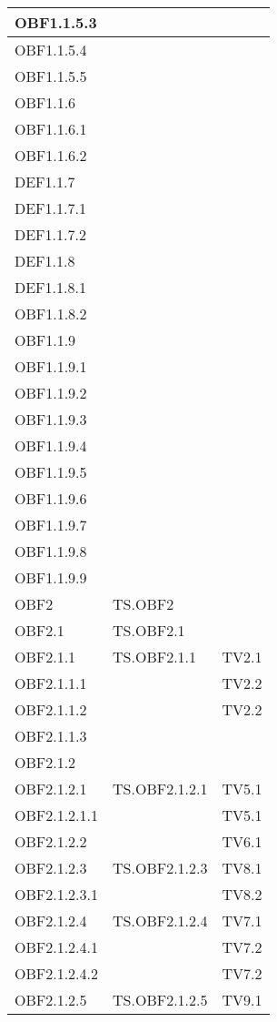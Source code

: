 \documentclass{scalatekids-article}
\begin{document}
\begin{longtable}[H]{|l|p{4cm}|p{4cm}|}
\hline
OBF1.1.5.3 &  &\\
\hline
OBF1.1.5.4 &  &\\
\hline
OBF1.1.5.5 &  &\\
\hline
OBF1.1.6 & &\\
\hline
OBF1.1.6.1 &  &\\
\hline
OBF1.1.6.2 &  &\\
\hline
DEF1.1.7 & &\\
\hline
DEF1.1.7.1 & &\\
\hline
DEF1.1.7.2 & &\\
\hline
DEF1.1.8 & &\\
\hline
DEF1.1.8.1 & &\\
\hline
OBF1.1.8.2 &  &\\
\hline
OBF1.1.9 &  &\\
\hline
OBF1.1.9.1 &  &\\
\hline
OBF1.1.9.2 &  &\\
\hline
OBF1.1.9.3 &  &\\
\hline
OBF1.1.9.4 &  &\\
\hline
OBF1.1.9.5 &  &\\
\hline
OBF1.1.9.6 &  &\\
\hline
OBF1.1.9.7 &  &\\
\hline
OBF1.1.9.8 &  &\\
\hline
OBF1.1.9.9 &  &\\
\hline
OBF2 & TS.OBF2 & \\
\hline
OBF2.1 & TS.OBF2.1 &\\
\hline
OBF2.1.1 & TS.OBF2.1.1 & TV2.1\\
\hline
OBF2.1.1.1 & & TV2.2\\
\hline
OBF2.1.1.2 & & TV2.2\\
\hline
OBF2.1.1.3 & & \\
\hline
OBF2.1.2 & & \\
\hline
OBF2.1.2.1 & TS.OBF2.1.2.1 & TV5.1\\
\hline
OBF2.1.2.1.1 & & TV5.1\\
\hline
OBF2.1.2.2 & & TV6.1\\
\hline
OBF2.1.2.3 & TS.OBF2.1.2.3 & TV8.1\\
\hline
OBF2.1.2.3.1 & & TV8.2\\
\hline
OBF2.1.2.4 & TS.OBF2.1.2.4 & TV7.1\\
\hline
OBF2.1.2.4.1 & & TV7.2\\
\hline
OBF2.1.2.4.2 & & TV7.2\\
\hline
OBF2.1.2.5 & TS.OBF2.1.2.5 & TV9.1\\
\hline

\end{longtable}
\end{document}
